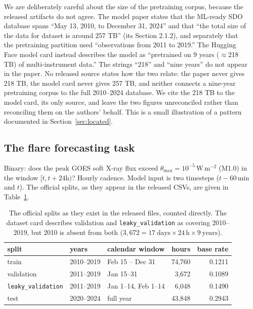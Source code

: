 \documentclass[11pt]{article}
\newcommand{\Wm}{\,\mathrm{W\,m^{-2}}}
\newcommand{\code}[1]{\texttt{#1}}
\begin{document}
We are deliberately careful about the size of the pretraining corpus, because the
released artifacts do not agree. The model paper states that the ML-ready SDO
database spans ``May 13, 2010, to December 31, 2024'' and that ``the total size of
the data for dataset is around 257 TB'' (its Section 2.1.2), and separately that
the pretraining partition used ``observations from 2011 to 2019.'' The Hugging
Face model card instead describes the model as ``pretrained on 9 years
($\approx$218 TB) of multi-instrument data.'' The strings ``218'' and ``nine
years'' do not appear in the paper. No released source states how the two
relate: the paper never gives 218 TB, the model card never gives 257 TB, and
neither connects a nine-year pretraining corpus to the full 2010--2024 database.
We cite the 218 TB to the model card, its only source, and leave the two figures
unreconciled rather than reconciling them on the authors' behalf. This is a small illustration of a pattern documented
in Section~\ref{sec:located}.

\subsection{The flare forecasting task}

Binary: does the peak GOES soft X-ray flux exceed
$\theta_{\max} = 10^{-5}\Wm$ (M1.0) in the window $[t, t+24\mathrm{h})$? Hourly
cadence. Model input is two timesteps ($t-60$\,min and $t$). The official splits,
as they appear in the released CSVs, are given in Table~\ref{tab:splits}.

\begin{table}[htbp]
\centering
\caption{The official splits as they exist in the released files, counted
directly. The dataset card describes validation and \code{leaky\_validation} as
covering 2010--2019, but 2010 is absent from both
($3{,}672 = 17\ \mathrm{days} \times 24\,\mathrm{h} \times 9\ \mathrm{years}$).}
\label{tab:splits}
\begin{tabular}{lllrr}
\toprule
split & years & calendar window & hours & base rate \\
\midrule
train & 2010--2019 & Feb 15 -- Dec 31 & 74{,}760 & 0.1211 \\
validation & 2011--2019 & Jan 15--31 & 3{,}672 & 0.1089 \\
\code{leaky\_validation} & 2011--2019 & Jan 1--14, Feb 1--14 & 6{,}048 & 0.1490 \\
test & 2020--2024 & full year & 43{,}848 & 0.2943 \\
\bottomrule
\end{tabular}
\end{table}
\end{document}
